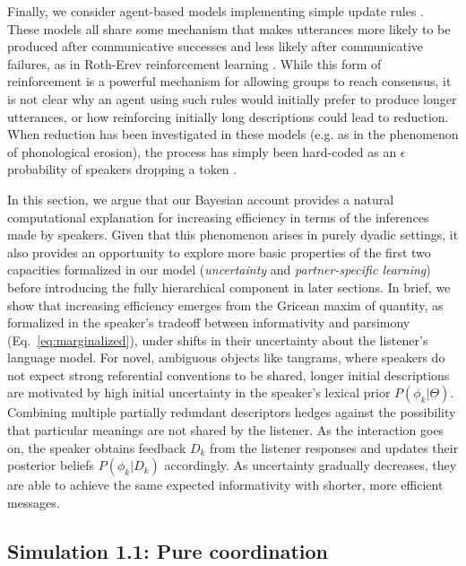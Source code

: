 Finally, we consider agent-based models implementing simple update rules \cite{steels_self-organizing_1995,barr_establishing_2004,young_evolution_2015}.
These models all share some mechanism that makes utterances more likely to be produced after communicative successes and less likely after communicative failures, as in Roth-Erev reinforcement learning \cite{erev1998predicting}.
While this form of reinforcement is a powerful mechanism for allowing groups to reach consensus, it is not clear why an agent using such rules would initially prefer to produce longer utterances, or how reinforcing initially long descriptions could lead to reduction. %
When reduction has been investigated in these models (e.g. as in the phenomenon of phonological erosion), the process has simply been hard-coded as an $\epsilon$ probability of speakers dropping a token \cite{beuls2013agent,steels2016agent}.

In this section, we argue that our Bayesian account provides a natural computational explanation for increasing efficiency in terms of the inferences made by speakers.
Given that this phenomenon arises in purely dyadic settings, it also provides an opportunity to explore more basic properties of the first two capacities formalized in our model (\emph{uncertainty} and \emph{partner-specific learning}) before introducing the fully hierarchical component in later sections. 
In brief, we show that increasing efficiency emerges from the Gricean maxim of quantity, as formalized in the speaker's tradeoff between informativity and parsimony (Eq.~\ref{eq:marginalized}), under shifts in their uncertainty about the listener's language model. 
For novel, ambiguous objects like tangrams, where speakers do not expect strong referential conventions to be shared, longer initial descriptions are motivated by high initial uncertainty in the speaker's lexical prior $P(\phi_k | \Theta)$. 
Combining multiple partially redundant descriptors hedges against the possibility that particular meanings are not shared by the listener.
As the interaction goes on, the speaker obtains feedback $D_k$ from the listener responses and updates their posterior beliefs $P(\phi_k | D_k)$ accordingly. 
As uncertainty gradually decreases, they are able to achieve the same expected informativity with shorter, more efficient messages. 

\subsection{Simulation 1.1: Pure coordination}

